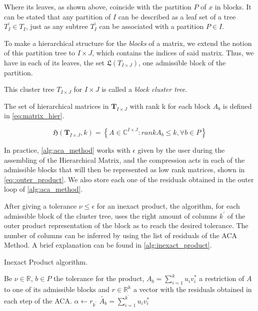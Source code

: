 Where its leaves, as shown above, coincide with the partition $P$ of $x$ in blocks. It can be stated \cite{hackbusch2015hierarchical} that any partition of $I$ can be described as a leaf set of a tree $T^{'}_{I} \in T_{I}$, just as any subtree $T_{I}^{'}$ can be associated with a partition $P \in I$.

To make a hierarchical structure for the \textit{blocks} of a matrix, we extend the notion of this partition tree to $I \times J$, which contains the indices of said matrix. Thus, we have in each of its leaves, the set $\mathfrak{L}(T_{I \times J})$, one admissible block of the partition.

This cluster tree $T_{I \times J}$ for $I \times J$ is called a \textit{block cluster tree}.


The set of hierarchical matrices in $\mathbf{T}_{I \times J}$ with rank k for each block $A_{b}$ is defined in \ref{eq:matrix_hier}.

\begin{equation}\label{eq:matrix_hier}
    \mathfrak{H}(\mathbf{T}_{I \times J},k) = \left\{  A\in \mathbb{C}^{I\times J} : rankA_{b} \leq k, \forall b \in P \right\}
\end{equation}



In practice, \ref{alg:aca_method} works with $\epsilon$ given by the user during the assembling of the Hierarchical Matrix, and the compression acts in each of the admissible blocks that will then be represented as low rank matrices, shown in \ref{eq::outer_product}. We also store each one of the residuals obtained in the outer loop of \ref{alg:aca_method}.

After giving a tolerance $\nu  \leq \epsilon$ for an inexact product, the algorithm, for each admissible block of the cluster tree, uses the right amount of columns $k^{'}$ of the outer product representation of the block as to reach the desired tolerance. The number of columns can be inferred by using the list of residuals of the ACA Method. A brief explanation can be found in \ref{alg:inexact_product}.

\begin{algorithm}
    \caption{Inexact Product algorithm.}\label{alg:inexact_product}
    \begin{algorithmic}[1]
        \State Be $\nu \in \mathbb{R}$, $b \in P$ the tolerance for the product,  $A_{b}= \sum_{i=1}^{k}u_{i}v_{i}^{*}$ a restriction of $A$ to one of its admissible blocks and $r \in \mathbb{R^{k}}$ a vector with the residuals obtained in each step of the ACA.
        \State $\alpha \leftarrow r_{k^{'}}$
        \If{$\alpha \leq \nu$}
        \State $\tilde{A_{b}}=\sum_{i=1}^{k^{'}}u_{i}v_{i}^{*}$
        \EndIf
        \EndFor

    \end{algorithmic}
\end{algorithm}


